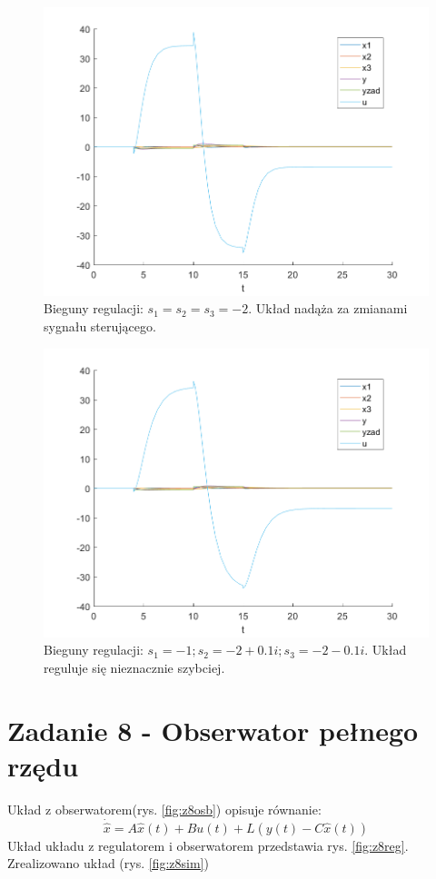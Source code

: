 \documentclass{article}
\begin{document}
\begin{figure}[H]
\centering
\includegraphics[width=0.9\linewidth]{z71}
\caption{Bieguny regulacji: $s_1 = s_2 = s_3 = -2$. Układ nadąża za zmianami sygnału sterującego.}
\label{fig:z71}
\end{figure}

\begin{figure}[H]
\centering
\includegraphics[width=0.9\linewidth]{z72}
\caption{Bieguny regulacji: $s_1 = -1; s_2 = -2 + 0.1i; s_3 = -2 -0.1i$. Układ reguluje się nieznacznie szybciej.}
\label{fig:z72}
\end{figure}
\section{Zadanie 8 - Obserwator pełnego rzędu}
Układ z obserwatorem(rys. \ref{fig:z8osb}) opisuje równanie:
\[\dot{\hat{x}} = A\hat{x}(t) + Bu(t) + L(y(t)-C\hat{x}(t))\]
Układ układu z regulatorem i obserwatorem przedstawia rys. \ref{fig:z8reg}. Zrealizowano układ (rys. \ref{fig:z8sim})
\end{document}
